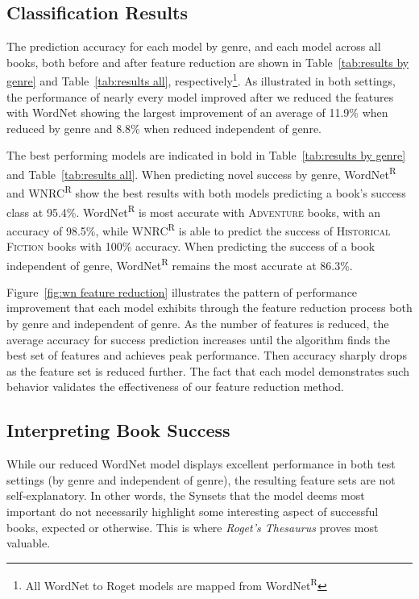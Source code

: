 \subsection*{Classification Results}
The prediction accuracy for each model by genre, and each model across all books, both before and after feature reduction are shown in Table~\ref{tab:results by genre} and Table~\ref{tab:results all}, respectively\footnote{All WordNet to Roget models are mapped from WordNet\textsuperscript{R}}.
As illustrated in both settings, the performance of nearly every model improved after we reduced the features with WordNet showing the largest improvement of an average of 11.9\% when reduced by genre and 8.8\% when reduced independent of genre.

The best performing models are indicated in bold in Table~\ref{tab:results by genre} and Table~\ref{tab:results all}.
When predicting novel success by genre, WordNet\textsuperscript{R} and WNRC\textsuperscript{R} show the best results with both models predicting a book's success class at 95.4\%.
WordNet\textsuperscript{R} is most accurate with \textsc{Adventure} books, with an accuracy of 98.5\%, while WNRC\textsuperscript{R} is able to predict the success of \textsc{Historical Fiction} books with 100\% accuracy.
When predicting the success of a book independent of genre, WordNet\textsuperscript{R} remains the most accurate at 86.3\%.

Figure~\ref{fig:wn feature reduction} illustrates the pattern of performance improvement that each model exhibits through the feature reduction process both by genre and independent of genre.
As the number of features is reduced, the average accuracy for success prediction increases until the algorithm finds the best set of features and achieves peak performance.
Then accuracy sharply drops as the feature set is reduced further.
The fact that each model demonstrates such behavior validates the effectiveness of our feature reduction method.



\subsection*{Interpreting Book Success}\label{subsec:int book success}
While our reduced WordNet model displays excellent performance in both test settings (by genre and independent of genre), the resulting feature sets are not self-explanatory.
In other words, the Synsets that the model deems most important do not necessarily highlight some interesting aspect of successful books, expected or otherwise.
This is where \textit{Roget's Thesaurus} proves most valuable.

